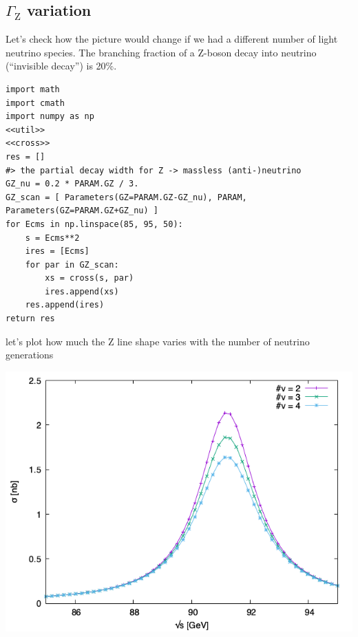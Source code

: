 \documentclass[11pt]{article}
\begin{document}
\subsection{\(\Gamma_\mathrm{Z}\) variation}
\label{sec:orgbf88740}
Let's check how the picture would change if we had a different number of light neutrino species.
The branching fraction of a Z-boson decay into neutrino (``invisible decay'') is 20\%.
\begin{verbatim}
import math
import cmath
import numpy as np
<<util>>
<<cross>>
res = []
#> the partial decay width for Z -> massless (anti-)neutrino
GZ_nu = 0.2 * PARAM.GZ / 3.
GZ_scan = [ Parameters(GZ=PARAM.GZ-GZ_nu), PARAM, Parameters(GZ=PARAM.GZ+GZ_nu) ]
for Ecms in np.linspace(85, 95, 50):
    s = Ecms**2
    ires = [Ecms]
    for par in GZ_scan:
        xs = cross(s, par)
        ires.append(xs)
    res.append(ires)
return res
\end{verbatim}
let's plot how much the Z line shape varies with the number of neutrino generations
\begin{center}
\includegraphics[width=.9\linewidth]{GZ_var.png}
\end{center}
\end{document}
